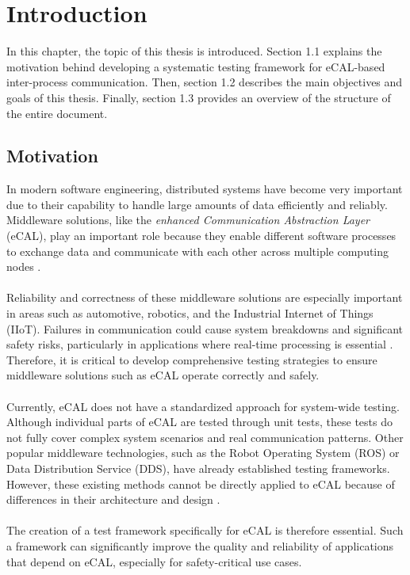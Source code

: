 \clearpage

\section{Introduction}

In this chapter, the topic of this thesis is introduced. Section 1.1 explains the motivation behind developing a systematic testing framework for eCAL-based inter-process communication. Then, section 1.2 describes the main objectives and goals of this thesis. Finally, section 1.3 provides an overview of the structure of the entire document.


\subsection{Motivation}

In modern software engineering, distributed systems have become very important due to their capability to handle large amounts of data efficiently and reliably. Middleware solutions, like the \textit{enhanced Communication Abstraction Layer} (eCAL), play an important role because they enable different software processes to exchange data and communicate with each other across multiple computing nodes \cite{ecal_github}. 
\\
\\
Reliability and correctness of these middleware solutions are especially important in areas such as automotive, robotics, and the Industrial Internet of Things (IIoT). Failures in communication could cause system breakdowns and significant safety risks, particularly in applications where real-time processing is essential \cite{middleware_challenges}. Therefore, it is critical to develop comprehensive testing strategies to ensure middleware solutions such as eCAL operate correctly and safely.
\\
\\
Currently, eCAL does not have a standardized approach for system-wide testing. Although individual parts of eCAL are tested through unit tests, these tests do not fully cover complex system scenarios and real communication patterns. Other popular middleware technologies, such as the Robot Operating System (ROS) or Data Distribution Service (DDS), have already established testing frameworks. However, these existing methods cannot be directly applied to eCAL because of differences in their architecture and design \cite{ipc_performance_analysis}. 
\\
\\
The creation of a test framework specifically for eCAL is therefore essential. Such a framework can significantly improve the quality and reliability of applications that depend on eCAL, especially for safety-critical use cases.

